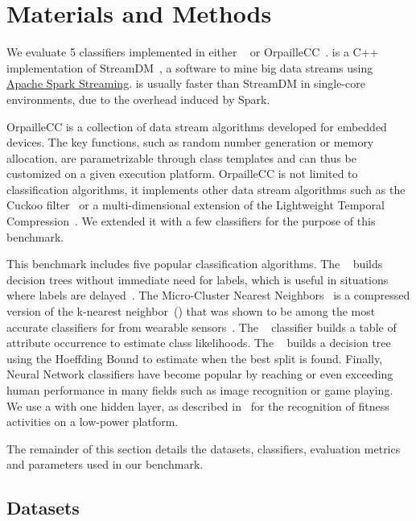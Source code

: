 \section{Materials and Methods}
We evaluate 5 classifiers implemented in either \streamdmcpp~\cite{StreamDM-CPP}
or OrpailleCC~\cite{OrpailleCC}.  \streamdmcpp is a C++ implementation of
StreamDM~\cite{StreamDM}, a software to mine big data streams using
\href{https://spark.apache.org/streaming/}{Apache Spark Streaming}. \streamdmcpp
is usually faster than StreamDM in single-core environments, due to the overhead
induced by Spark.

OrpailleCC is a collection of data stream algorithms developed for embedded
devices. The key functions, such as random number generation or memory
allocation, are parametrizable through class templates and can thus be
customized on a given execution platform.  OrpailleCC is not limited to
classification algorithms, it implements other data stream algorithms such as
the Cuckoo filter~\cite{cuckoo} or a multi-dimensional extension of the
Lightweight Temporal Compression~\cite{multi-ltc}. We extended it with a few
classifiers for the purpose of this benchmark.

This benchmark includes five popular classification algorithms.  The
\mondrianforest~\cite{mondrian2014} builds decision trees without immediate need
for labels, which is useful in situations where labels are
delayed~\cite{stream_learning_review}.  The Micro-Cluster Nearest
Neighbors~\cite{mc-nn} is a compressed version of the k-nearest neighbor~(\knn) 
that was shown to be among the most accurate classifiers for \har from wearable
sensors~\cite{Janidarmian_2017}. The \naivebayes~\cite{naive_bayes} classifier
builds a table of attribute occurrence to estimate class likelihoods.  The
\hoeffdingtree~\cite{VFDT} builds a decision tree using the Hoeffding Bound to
estimate when the best split is found.  Finally, Neural Network classifiers have
become popular by reaching or even exceeding human performance in many fields
such as image recognition or game playing. We use a \FNN with one hidden layer,
as described in~\cite{omid_2019} for the recognition of fitness activities on a
low-power platform.

The remainder of this section details the datasets, classifiers, evaluation
metrics and parameters used in our benchmark.

\subsection{Datasets}
\label{sec:method-dataset}
